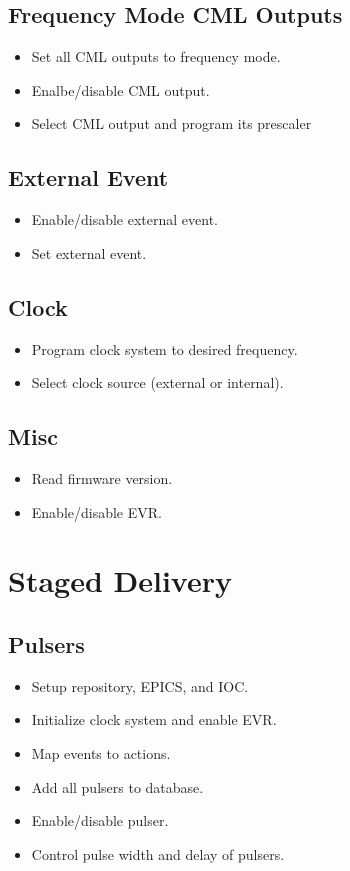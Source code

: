 \documentclass[a4paper,10pt]{article}
\begin{document}
	\subsection{Frequency Mode CML Outputs}
	\begin{itemize}
		\item Set all CML outputs to frequency mode.
		\item Enalbe/disable CML output.
		\item Select CML output and program its prescaler
	\end{itemize}

	\subsection{External Event}
	\begin{itemize}
		\item Enable/disable external event.
		\item Set external event.
	\end{itemize}

	\subsection{Clock}
	\begin{itemize}
		\item Program clock system to desired frequency.
		\item Select clock source (external or internal).
	\end{itemize}

	\subsection{Misc}
	\begin{itemize}
		\item Read firmware version.
		\item Enable/disable EVR.
	\end{itemize}

\section{Staged Delivery}
	\subsection{Pulsers}
	\begin{itemize}
		\item Setup repository, EPICS, and IOC.
		\item Initialize clock system and enable EVR.
		\item Map events to actions.
		\item Add all pulsers to database.
		\item Enable/disable pulser.
		\item Control pulse width and delay of pulsers.
	\end{itemize}
\end{document}
